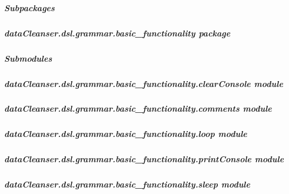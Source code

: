 \documentclass[letterpaper,10pt,english]{sphinxmanual}
\begin{document}
\subparagraph{Subpackages}
\label{dataCleanser.dsl.grammar:subpackages}

\subparagraph{dataCleanser.dsl.grammar.basic\_functionality package}
\label{dataCleanser.dsl.grammar.basic_functionality:datacleanser-dsl-grammar-basic-functionality-package}\label{dataCleanser.dsl.grammar.basic_functionality::doc}

\subparagraph{Submodules}
\label{dataCleanser.dsl.grammar.basic_functionality:submodules}

\subparagraph{dataCleanser.dsl.grammar.basic\_functionality.clearConsole module}
\label{dataCleanser.dsl.grammar.basic_functionality:module-dataCleanser.dsl.grammar.basic_functionality.clearConsole}\label{dataCleanser.dsl.grammar.basic_functionality:datacleanser-dsl-grammar-basic-functionality-clearconsole-module}

\begin{fulllineitems}
\label{dataCleanser.dsl.grammar.basic_functionality:dataCleanser.dsl.grammar.basic_functionality.clearConsole.clearConsole}
\end{fulllineitems}



\subparagraph{dataCleanser.dsl.grammar.basic\_functionality.comments module}
\label{dataCleanser.dsl.grammar.basic_functionality:module-dataCleanser.dsl.grammar.basic_functionality.comments}\label{dataCleanser.dsl.grammar.basic_functionality:datacleanser-dsl-grammar-basic-functionality-comments-module}

\subparagraph{dataCleanser.dsl.grammar.basic\_functionality.loop module}
\label{dataCleanser.dsl.grammar.basic_functionality:datacleanser-dsl-grammar-basic-functionality-loop-module}

\subparagraph{dataCleanser.dsl.grammar.basic\_functionality.printConsole module}
\label{dataCleanser.dsl.grammar.basic_functionality:datacleanser-dsl-grammar-basic-functionality-printconsole-module}

\subparagraph{dataCleanser.dsl.grammar.basic\_functionality.sleep module}
\label{dataCleanser.dsl.grammar.basic_functionality:datacleanser-dsl-grammar-basic-functionality-sleep-module}\label{dataCleanser.dsl.grammar.basic_functionality:module-dataCleanser.dsl.grammar.basic_functionality.sleep}
\end{document}
